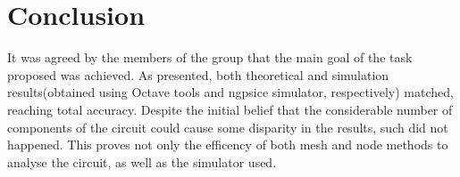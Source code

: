 \pagebreak
\section{Conclusion}
\label{conclusion}

It was agreed by the members of the group that the main goal of the task proposed was achieved. As presented, both theoretical and simulation results(obtained using Octave tools and ngpsice simulator, respectively) matched, reaching total accuracy. Despite the initial belief that the considerable number of components of the circuit could cause some disparity in the results, such did not happened. 
This proves not only the efficency of both mesh and node methods to analyse the circuit, as well as the simulator used.

